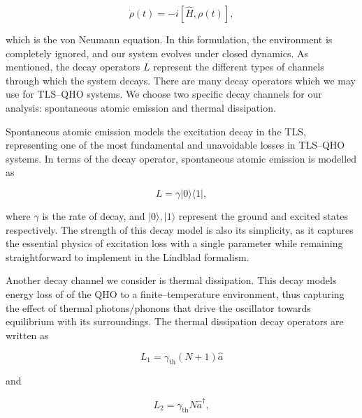 \documentclass[11pt]{article}
\begin{document}
\begin{equation}
    \dot \rho(t) = - i[\hat{H}, \rho(t)],
\end{equation}

which is the von Neumann equation. In this formulation, the environment is completely ignored, and our system evolves under closed dynamics. As mentioned, the decay operators $L$ represent the different types of channels through which the system decays. There are many decay operators which we may use for TLS--QHO systems. We choose two specific decay channels for our analysis: spontaneous atomic emission and thermal dissipation. 

Spontaneous atomic emission models the excitation decay in the TLS, representing one of the most fundamental and unavoidable losses in TLS--QHO systems. In terms of the decay operator, spontaneous atomic emission is modelled as

\begin{equation} \label{eqn:L_spont}
    L = \gamma|0\rangle\langle1|,
\end{equation}

where $\gamma$ is the rate of decay, and $|0\rangle,|1\rangle$ represent the ground and excited states respectively. The strength of this decay model is also its simplicity, as it captures the essential physics of excitation loss with a single parameter while remaining straightforward to implement in the Lindblad formalism.

Another decay channel we consider is thermal dissipation. This decay models energy loss of of the QHO to a finite--temperature environment, thus capturing the effect of thermal photons/phonons that drive the oscillator towards equilibrium with its surroundings. The thermal dissipation decay operators are written as 

\begin{equation}\label{eqn:L_therm}
    L_1 = \gamma_{\scriptscriptstyle \text{th}}(N+1)\hat{a} 
\end{equation}

and 

\begin{equation*}
    L_2 = \gamma_{\scriptscriptstyle \text{th}}N\hat{a}^\dagger ,
\end{equation*}
\end{document}
